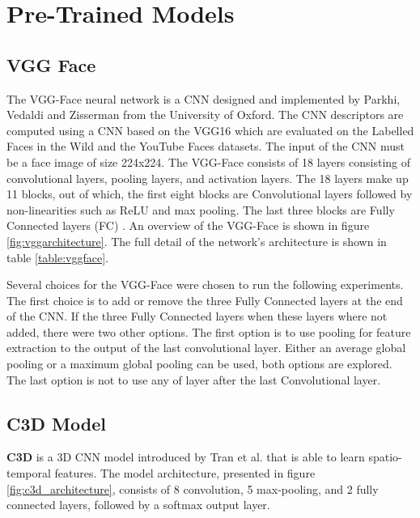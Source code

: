 \section{Pre-Trained Models}

\subsection{VGG Face}

The VGG-Face neural network is a CNN designed and implemented by Parkhi, Vedaldi and Zisserman \cite{Parkhi2015DeepRecognition} from the University of Oxford. The CNN descriptors are computed using a CNN based on the VGG16 which are evaluated on the Labelled Faces in the Wild \cite{HuangLabeledEnvironments} and the YouTube Faces \cite{WolfFaceSimilarity} datasets. The input of the CNN must be a face image of size 224x224. The VGG-Face consists of 18 layers consisting of convolutional layers, pooling layers, and activation layers. The 18 layers make up 11 blocks, out of which, the first eight blocks are Convolutional layers followed by non-linearities such as ReLU and max pooling. The last three blocks are Fully Connected layers (FC) \cite{Parkhi2015DeepRecognition}. An overview of the VGG-Face is shown in figure \ref{fig:vggarchitecture}. The full detail of the network's architecture is shown in table \ref{table:vggface}.



Several choices for the VGG-Face were chosen to run the following experiments. The first choice is to add or remove the three Fully Connected layers at the end of the CNN. If the three Fully Connected layers when these layers where not added, there were two other options. The first option is to use pooling for feature extraction to the output of the last convolutional layer. Either an average global pooling or a maximum global pooling can be used, both options are explored. The last option is not to use any of layer after the last Convolutional layer.



\subsection{C3D Model}

\textbf{C3D} is a 3D CNN model introduced by Tran et al. \cite{Tran2015LearningNetworksb} that is able to learn spatio-temporal features. The model architecture, presented in figure \ref{fig:c3d_architecture}, consists of 8 convolution, 5 max-pooling, and 2 fully connected layers, followed by a softmax output layer. 

